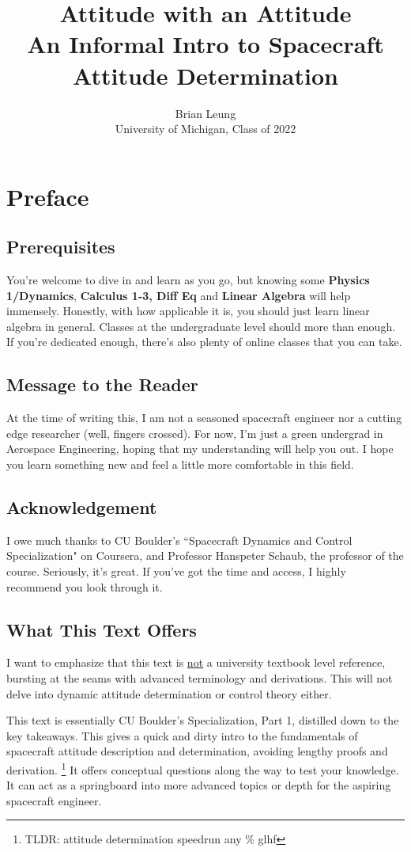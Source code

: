 \documentclass[a4paper,14pt]{extreport}
\title{Attitude with an Attitude \\
\large An Informal Intro to Spacecraft Attitude Determination}
\author{Brian Leung\\University of Michigan, Class of 2022}
\begin{document}
\maketitle
\setcounter{tocdepth}{0}
\tableofcontents{}
\chapter{Preface}
\section{Prerequisites}
You're welcome to dive in and learn as you go, but knowing some \textbf{Physics 1/Dynamics}, \textbf{Calculus 1-3, Diff Eq} and \textbf{Linear Algebra} will help immensely. Honestly, with how applicable it is, you should just learn linear algebra in general. Classes at the undergraduate level should more than enough. If you're dedicated enough, there's also plenty of online classes that you can take.

\section{Message to the Reader}
At the time of writing this, I am not a seasoned spacecraft engineer nor a cutting edge researcher (well, fingers crossed). For now, I'm just a green undergrad in Aerospace Engineering, hoping that my understanding  will help you out. I hope you learn something new and feel a little more comfortable in this field.

\section{Acknowledgement}
I owe much thanks to CU Boulder's ``Spacecraft Dynamics and Control Specialization" on Coursera, and Professor Hanspeter Schaub, the professor of the course. Seriously, it's great. If you've got the time and access, I highly recommend you look through it.

\section{What This Text Offers}
I want to emphasize that this text is \underline{not} a university textbook level reference, bursting at the seams with advanced terminology and derivations. This will not delve into dynamic attitude determination or control theory either. 

This text is essentially CU Boulder's Specialization, Part 1, distilled down to the key takeaways. This gives a quick and dirty intro to the fundamentals of spacecraft attitude description and determination, avoiding lengthy proofs and derivation. \footnote{TLDR: attitude determination speedrun any \% glhf} It offers conceptual questions along the way to test your knowledge. It can act as a springboard into more advanced topics or depth for the aspiring spacecraft engineer.
\end{document}
